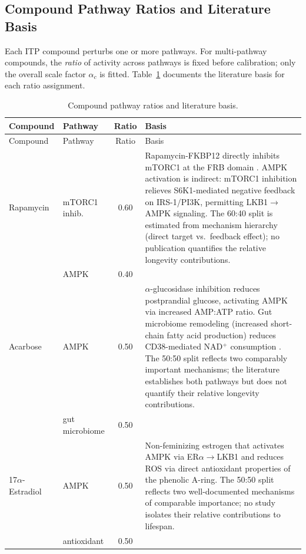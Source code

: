 \documentclass[11pt]{article}
\begin{document}
\subsection{Compound Pathway Ratios and Literature Basis}

Each ITP compound perturbs one or more pathways. For multi-pathway compounds, the \emph{ratio} of activity across pathways is fixed before calibration; only the overall scale factor $\alpha_c$ is fitted. Table~\ref{tab:pathway_ratios} documents the literature basis for each ratio assignment.

\begin{longtable}{@{}llcp{7.5cm}@{}}
\caption{Compound pathway ratios and literature basis.}
\label{tab:pathway_ratios} \\
\toprule
Compound & Pathway & Ratio & Basis \\
\midrule
\endfirsthead
\toprule
Compound & Pathway & Ratio & Basis \\
\midrule
\endhead
\bottomrule
\endlastfoot

Rapamycin & mTORC1 inhib. & 0.60 & Rapamycin-FKBP12 directly inhibits mTORC1 at the FRB domain \citep{Lamming2014}. AMPK activation is indirect: mTORC1 inhibition relieves S6K1-mediated negative feedback on IRS-1/PI3K, permitting LKB1$\to$AMPK signaling. The 60:40 split is estimated from mechanism hierarchy (direct target vs.\ feedback effect); no publication quantifies the relative longevity contributions. \\
 & AMPK & 0.40 & \\
\hline

Acarbose & AMPK & 0.50 & $\alpha$-glucosidase inhibition reduces postprandial glucose, activating AMPK via increased AMP:ATP ratio. Gut microbiome remodeling (increased short-chain fatty acid production) reduces CD38-mediated NAD$^+$ consumption \citep{Harrison2014}. The 50:50 split reflects two comparably important mechanisms; the literature establishes both pathways but does not quantify their relative longevity contributions. \\
 & gut microbiome & 0.50 & \\
\hline

17$\alpha$-Estradiol & AMPK & 0.50 & Non-feminizing estrogen that activates AMPK via ER$\alpha$$\to$LKB1 \citep{McInnes2011} and reduces ROS via direct antioxidant properties of the phenolic A-ring. The 50:50 split reflects two well-documented mechanisms of comparable importance; no study isolates their relative contributions to lifespan. \\
 & antioxidant & 0.50 & \\
\hline


\end{longtable}
\end{document}
